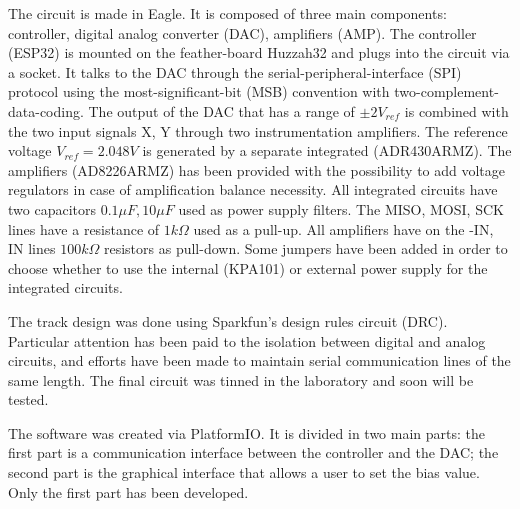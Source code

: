 The circuit is made in Eagle. It is composed of three main components: controller, digital analog converter (DAC), amplifiers (AMP).
The controller (ESP32) is mounted on the feather-board Huzzah32 and plugs into the circuit via a socket. It talks to the DAC through the serial-peripheral-interface (SPI) protocol using the most-significant-bit (MSB) convention with two-complement-data-coding.
The output of the DAC that has a range of $\pm 2 V_{ref}$ is combined with the two input signals X, Y through two instrumentation amplifiers. The reference voltage $V_{ref} = 2.048V$ is generated by a separate integrated (ADR430ARMZ).
The amplifiers (AD8226ARMZ) has been provided with the possibility to add voltage regulators in case of amplification balance necessity.
All integrated circuits have two capacitors $0.1 \mu F, 10 \mu F$ used as power supply filters. The MISO, MOSI, SCK lines have a resistance of $1 k \Omega$ used as a pull-up.
All amplifiers have on the -IN, IN lines $100 k \Omega$ resistors as pull-down. Some jumpers have been added in order to choose whether to use the internal (KPA101) or external power supply for the integrated circuits.

The track design was done using Sparkfun’s design rules circuit (DRC). Particular attention has been paid to the isolation between digital and analog circuits, and efforts have been made to maintain serial communication lines of the same length. The final circuit was tinned in the laboratory and soon will be tested.

The software was created via PlatformIO. It is divided in two main parts: the first part is a communication interface between the controller and the DAC; the second part is the graphical interface that allows a user to set the bias value. Only the first part has been developed.



